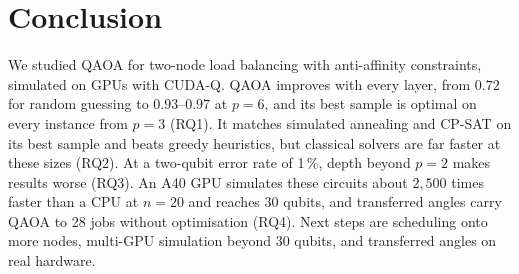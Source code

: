 
\section{Conclusion}
\label{sec:conclusion}

We studied QAOA for two-node load balancing with anti-affinity constraints, simulated on GPUs with CUDA-Q.
QAOA improves with every layer, from $0.72$ for random guessing to $0.93$--$0.97$ at $p = 6$, and its best sample is optimal on every instance from $p = 3$ (RQ1).
It matches simulated annealing and CP-SAT on its best sample and beats greedy heuristics, but classical solvers are far faster at these sizes (RQ2).
At a two-qubit error rate of 1\,\%, depth beyond $p = 2$ makes results worse (RQ3).
An A40 GPU simulates these circuits about $2{,}500$ times faster than a CPU at $n = 20$ and reaches 30 qubits, and transferred angles carry QAOA to 28 jobs without optimisation (RQ4).
Next steps are scheduling onto more nodes, multi-GPU simulation beyond 30 qubits, and transferred angles on real hardware.
